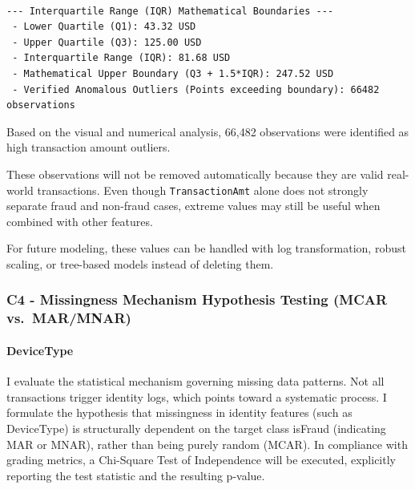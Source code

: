 \documentclass[11pt]{article}
\begin{document}
    \begin{center}
    \end{center}
    { \hspace*{\fill} \\}
    
    \begin{Verbatim}[commandchars=\\\{\}]
--- Interquartile Range (IQR) Mathematical Boundaries ---
 - Lower Quartile (Q1): 43.32 USD
 - Upper Quartile (Q3): 125.00 USD
 - Interquartile Range (IQR): 81.68 USD
 - Mathematical Upper Boundary (Q3 + 1.5*IQR): 247.52 USD
 - Verified Anomalous Outliers (Points exceeding boundary): 66482 observations
    \end{Verbatim}

    Based on the visual and numerical analysis, 66,482 observations were
identified as high transaction amount outliers.

These observations will not be removed automatically because they are
valid real-world transactions. Even though \texttt{TransactionAmt} alone
does not strongly separate fraud and non-fraud cases, extreme values may
still be useful when combined with other features.

For future modeling, these values can be handled with log
transformation, robust scaling, or tree-based models instead of deleting
them.

    \subsubsection{C4 - Missingness Mechanism Hypothesis Testing (MCAR
vs.~MAR/MNAR)}\label{c4---missingness-mechanism-hypothesis-testing-mcar-vs.-marmnar}

    \paragraph{DeviceType}\label{devicetype}

    I evaluate the statistical mechanism governing missing data patterns.
Not all transactions trigger identity logs, which points toward a
systematic process. I formulate the hypothesis that missingness in
identity features (such as DeviceType) is structurally dependent on the
target class isFraud (indicating MAR or MNAR), rather than being purely
random (MCAR). In compliance with grading metrics, a Chi-Square Test of
Independence will be executed, explicitly reporting the test statistic
and the resulting p-value.
\end{document}
